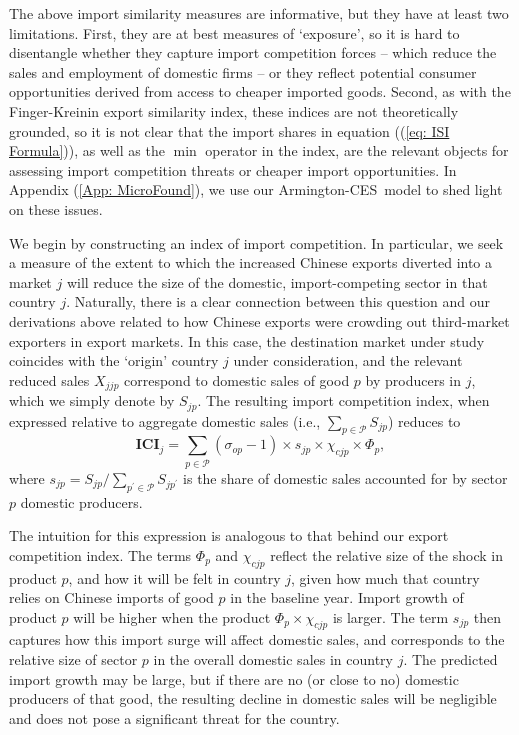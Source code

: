 \documentclass[english,12pt]{article}
\theoremstyle{definition}
\let\oldref\ref
\renewcommand{\ref}[1]{(\oldref{#1})}
\begin{document}
The above import similarity measures are informative, but they have at least
two limitations. First, they are at best measures of `exposure', so it is
hard to disentangle whether they capture import competition forces -- which
reduce the sales and employment of domestic firms -- or they reflect
potential consumer opportunities derived from access to cheaper imported goods.
Second, as with the Finger-Kreinin export similarity index, these indices
are not theoretically grounded, so it is not clear that the import shares in
equation (\ref{eq: ISI Formula}), as well as the $\min $ operator in the
index, are the relevant objects for assessing import competition threats or
cheaper import opportunities. In Appendix \ref{App: MicroFound}, we use our Armington-CES\
model to shed light on these issues.

We begin by constructing an index of import competition. In particular, we
seek a measure of the extent to which the increased Chinese exports diverted
into a market $j$ will reduce the size of the domestic,
import-competing sector in that country $j$. Naturally, there is a clear 
connection between this
question and our derivations above related to how Chinese exports were
crowding out third-market exporters in export markets. In this case, the
destination market under study coincides with the `origin' country $j$ under
consideration, and the relevant reduced sales $X_{jjp}$ correspond to
domestic sales of good $p$ by producers in $j$, which we simply denote by $S_{jp}$.
The resulting import competition index, when expressed relative to aggregate
domestic sales (i.e., $\sum_{p\in \mathcal{P}}S_{jp}$) reduces to%
\begin{equation}
\boldsymbol{ICI}_{j}= \sum_{p\in \mathcal{P}}\left(\sigma_{op}-1\right)\times s_{jp}\times \chi
_{cjp}\times\Phi _{p},  \label{eq: ICI Baseline}
\end{equation}%
where $s_{jp}=S_{jp}/\sum_{p^{\prime }\in \mathcal{P}}S_{jp^{\prime }}$ is
the share of domestic sales accounted for by sector $p$ domestic producers.

The intuition for this expression is analogous to that behind our export
competition index. The terms $\Phi _{p}$ and $\chi _{cjp}$ reflect the
relative size of the shock in product $p$, and how it will be felt in
country $j$, given how much that country relies on Chinese imports of good $p
$ in the baseline year. Import growth of product $p$ will be higher when the
product $\Phi _{p}\times \chi _{cjp}$ is larger. The term $s_{jp}$ then
captures how this import surge will affect domestic sales, and corresponds
to the relative size of sector $p$ in the overall domestic sales in country $j$.
The predicted import growth may be large, but if there are no (or close to
no) domestic producers of that good, the resulting decline in domestic sales
will be negligible and does not pose a significant threat for the country.
\end{document}

